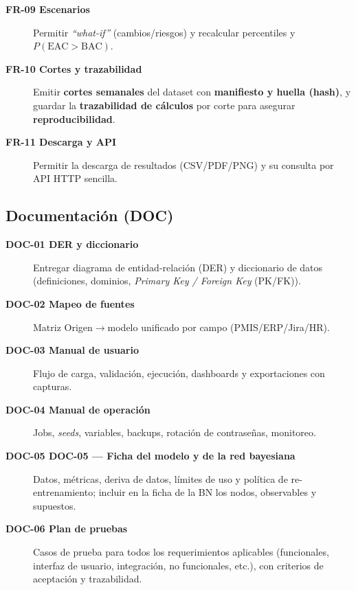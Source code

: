 \documentclass[12pt]
{charter}
\begin{document}
\begin{description}
  \item[\textbf{FR-09 Escenarios}] Permitir \textit{“what-if”} (cambios/riesgos) y recalcular percentiles y $P(\text{EAC}>\text{BAC})$.

  \item[\textbf{FR-10 Cortes y trazabilidad}] Emitir \textbf{cortes semanales} del dataset con \textbf{manifiesto y huella (hash)}, y guardar la \textbf{trazabilidad de cálculos} por corte para asegurar \textbf{reproducibilidad}.

  \item[\textbf{FR-11 Descarga y API}] Permitir la descarga de resultados (CSV/PDF/PNG) y su consulta por API HTTP sencilla.

\end{description}

\subsection{Documentación (DOC)}
\begin{description}
  \item[\textbf{DOC-01 DER y diccionario}] Entregar diagrama de entidad-relación (DER) y diccionario de datos (definiciones, dominios, \textit{Primary Key / Foreign Key} (PK/FK)).

  \item[\textbf{DOC-02 Mapeo de fuentes}] Matriz Origen$\rightarrow$modelo unificado por campo (PMIS/ERP/Jira/HR).

  \item[\textbf{DOC-03 Manual de usuario}] Flujo de carga, validación, ejecución, dashboards y exportaciones con capturas.

  \item[\textbf{DOC-04 Manual de operación}] Jobs, \textit{seeds}, variables, backups, rotación de contraseñas, monitoreo.

  \item[\textbf{DOC-05 DOC-05 — Ficha del modelo y de la red bayesiana}] Datos, métricas, deriva de datos, límites de uso y política de re-entrenamiento; incluir en la ficha de la BN los nodos, observables y supuestos.

  \item[\textbf{DOC-06 Plan de pruebas}] Casos de prueba para todos los requerimientos aplicables (funcionales, interfaz de usuario, integración, no funcionales, etc.), con criterios de aceptación y trazabilidad.

\end{description}
\end{document}
